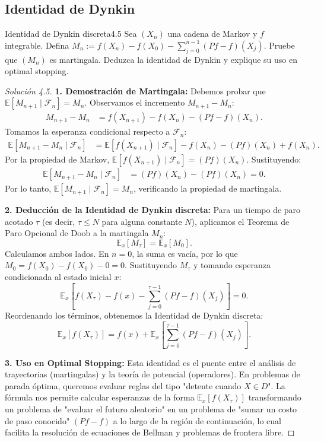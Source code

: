 \documentclass[10pt,a4paper]{article}
\begin{document}
\newpage
\subsection{Identidad de Dynkin}

\begin{ejercicio}{Identidad de Dynkin discreta}{4.5}
    Sea $(X_n)$ una cadena de Markov y $f$ integrable. Defina $M_n := f(X_n) - f(X_0) - \sum_{j=0}^{n-1} (Pf - f)(X_j)$. Pruebe que $(M_n)$ es martingala. Deduzca la identidad de Dynkin y explique su uso en optimal stopping.
\end{ejercicio}

\begin{proof}[Solución 4.5]
    \textbf{1. Demostración de Martingala:}
    Debemos probar que $\mathbb{E}[M_{n+1} \mid \mathcal{F}_n] = M_n$. Observamos el incremento $M_{n+1} - M_n$:
    \begin{align*}
        M_{n+1} - M_n &= f(X_{n+1}) - f(X_n) - (Pf - f)(X_n).
    \end{align*}
    Tomamos la esperanza condicional respecto a $\mathcal{F}_n$:
    \begin{align*}
        \mathbb{E}[M_{n+1} - M_n \mid \mathcal{F}_n] &= \mathbb{E}[f(X_{n+1}) \mid \mathcal{F}_n] - f(X_n) - (Pf)(X_n) + f(X_n).
    \end{align*}
    Por la propiedad de Markov, $\mathbb{E}[f(X_{n+1}) \mid \mathcal{F}_n] = (Pf)(X_n)$. Sustituyendo:
    \begin{align*}
        \mathbb{E}[M_{n+1} - M_n \mid \mathcal{F}_n] &= (Pf)(X_n) - (Pf)(X_n) = 0.
    \end{align*}
    Por lo tanto, $\mathbb{E}[M_{n+1} \mid \mathcal{F}_n] = M_n$, verificando la propiedad de martingala.

    \textbf{2. Deducción de la Identidad de Dynkin discreta:}
    Para un tiempo de paro acotado $\tau$ (es decir, $\tau \le N$ para alguna constante $N$), aplicamos el Teorema de Paro Opcional de Doob a la martingala $M_n$:
    \[ \mathbb{E}_x[M_\tau] = \mathbb{E}_x[M_0]. \]
    Calculamos ambos lados. En $n=0$, la suma es vacía, por lo que $M_0 = f(X_0) - f(X_0) - 0 = 0$.
    Sustituyendo $M_\tau$ y tomando esperanza condicionada al estado inicial $x$:
    \[ \mathbb{E}_x \left[ f(X_\tau) - f(x) - \sum_{j=0}^{\tau-1} (Pf - f)(X_j) \right] = 0. \]
    Reordenando los términos, obtenemos la Identidad de Dynkin discreta:
    \[ \mathbb{E}_x[f(X_\tau)] = f(x) + \mathbb{E}_x \left[ \sum_{j=0}^{\tau-1} (Pf - f)(X_j) \right]. \]

    \textbf{3. Uso en Optimal Stopping:}
    Esta identidad es el puente entre el análisis de trayectorias (martingalas) y la teoría de potencial (operadores). En problemas de parada óptima, queremos evaluar reglas del tipo "detente cuando $X \in D$". La fórmula nos permite calcular esperanzas de la forma $\mathbb{E}_x[f(X_\tau)]$ transformando un problema de "evaluar el futuro aleatorio" en un problema de "sumar un costo de paso conocido" $(Pf - f)$ a lo largo de la región de continuación, lo cual facilita la resolución de ecuaciones de Bellman y problemas de frontera libre.
\end{proof}
\end{document}
